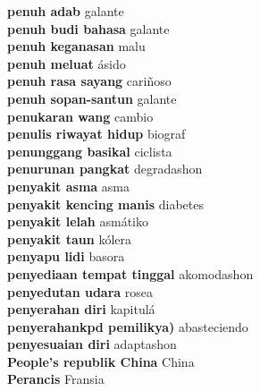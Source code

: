 \textbf{ penuh adab  } galante \\
\textbf{ penuh budi bahasa  } galante \\
\textbf{ penuh keganasan  } malu \\
\textbf{ penuh meluat  } ásido \\
\textbf{ penuh rasa sayang  } cariñoso \\
\textbf{ penuh sopan-santun  } galante \\
\textbf{ penukaran wang  } cambio \\
\textbf{ penulis riwayat hidup  } biograf \\
\textbf{ penunggang basikal  } ciclista \\
\textbf{ penurunan pangkat  } degradashon \\
\textbf{ penyakit asma  } asma \\
\textbf{ penyakit kencing manis  } diabetes \\
\textbf{ penyakit lelah  } asmátiko \\
\textbf{ penyakit taun  } kólera \\
\textbf{ penyapu lidi  } basora \\
\textbf{ penyediaan tempat tinggal  } akomodashon \\
\textbf{ penyedutan udara  } rosea \\
\textbf{ penyerahan diri  } kapitulá \\
\textbf{ penyerahankpd pemilikya)  } abasteciendo \\
\textbf{ penyesuaian diri  } adaptashon \\
\textbf{ People’s republik China  } China \\
\textbf{ Perancis  } Fransia \\
